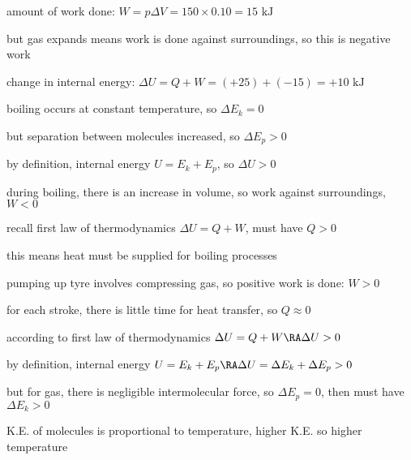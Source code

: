 
\sol amount of work done: $W = p \Delta V = 150 \times 0.10 = 15 \text{ kJ}$

but gas expands means work is done against surroundings, so this is negative work

change in internal energy: $\Delta U = Q +  W = (+25) + (-15) = +10 \text{ kJ}$ \eoe


\sol boiling occurs at constant temperature, so $\Delta E_k = 0$

but separation between molecules increased, so $\Delta E_p >0$

by definition, internal energy $U=E_k+E_p$, so $\Delta U >0$

during boiling, there is an increase in volume, so work against surroundings, $W<0$

recall first law of thermodynamics $\Delta U = Q + W$, must have $Q>0$

this means heat must be supplied for boiling processes \eoe


\sol pumping up tyre involves compressing gas, so positive work is done: $W>0$

for each stroke, there is little time for heat transfer, so $Q \approx 0$

according to first law of thermodynamics $\Delta U = Q + W \RA \Delta U >0$

by definition, internal energy $U=E_k + E_p \RA \Delta U = \Delta E_k + \Delta E_p>0$

but for gas, there is negligible intermolecular force, so $\Delta E_p=0$, then must have $\Delta E_k>0$

K.E. of molecules is proportional to temperature, higher K.E. so higher temperature \eoe


